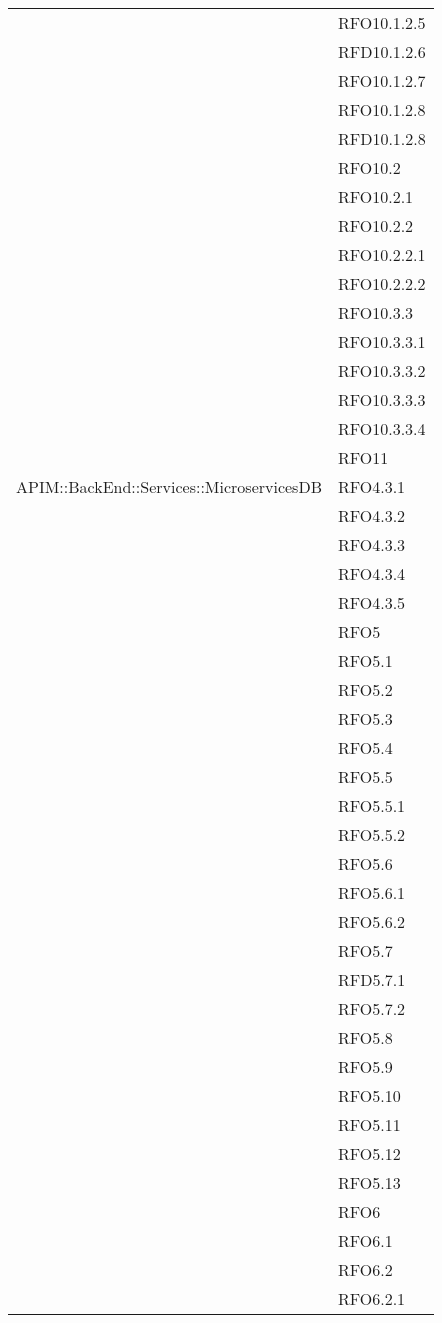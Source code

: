 \begin{longtable}{ p{12cm} | p{4cm} }
			& RFO10.1.2.5 \\
			& RFD10.1.2.6 \\
			& RFO10.1.2.7 \\
			& RFO10.1.2.8 \\
			& RFD10.1.2.8 \\
			& RFO10.2 \\
			& RFO10.2.1 \\
			& RFO10.2.2 \\
			& RFO10.2.2.1 \\
			& RFO10.2.2.2 \\
			& RFO10.3.3 \\
			& RFO10.3.3.1 \\
			& RFO10.3.3.2 \\
			& RFO10.3.3.3 \\
			& RFO10.3.3.4 \\
			& RFO11 \\
			\hline
			APIM::BackEnd::Services::MicroservicesDB
			& RFO4.3.1 \\
			& RFO4.3.2 \\
			& RFO4.3.3 \\
			& RFO4.3.4 \\
			& RFO4.3.5 \\
			& RFO5 \\
			& RFO5.1 \\
			& RFO5.2 \\
			& RFO5.3 \\
			& RFO5.4 \\
			& RFO5.5 \\
			& RFO5.5.1 \\
			& RFO5.5.2 \\
			& RFO5.6 \\
			& RFO5.6.1 \\
			& RFO5.6.2 \\
			& RFO5.7 \\
			& RFD5.7.1 \\
			& RFO5.7.2 \\
			& RFO5.8 \\
			& RFO5.9 \\
			& RFO5.10 \\
			& RFO5.11 \\
			& RFO5.12 \\
			& RFO5.13 \\
			& RFO6 \\
			& RFO6.1 \\
			& RFO6.2 \\
			& RFO6.2.1 \\

\end{longtable}

